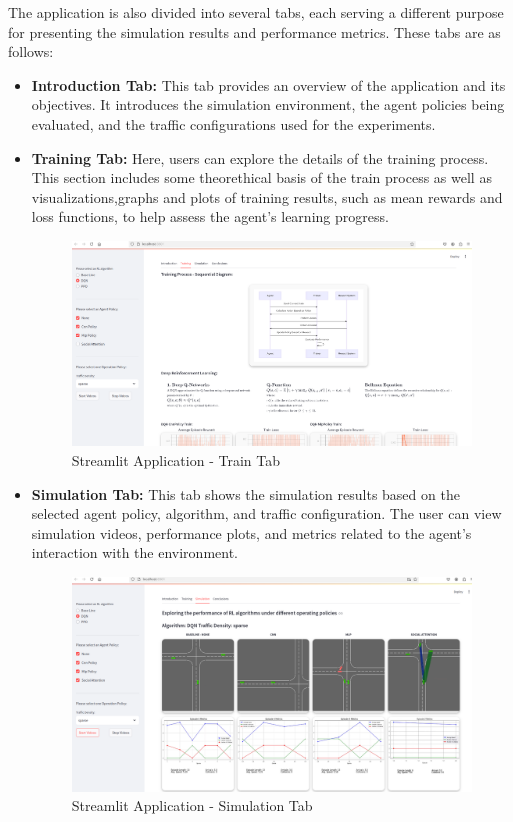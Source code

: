 The application is also divided into several tabs, each serving a different purpose for presenting the simulation results and performance metrics. 
These tabs are as follows:

\begin{itemize}
    \item \textbf{Introduction Tab:} 
    This tab provides an overview of the application and its objectives. It introduces the simulation environment, the agent policies being evaluated, and the traffic configurations used for the experiments.
    
    \item \textbf{Training Tab:} 
    Here, users can explore the details of the training process. This section includes some theorethical basis of the train process as well as visualizations,graphs and plots of training results, such as mean rewards and loss functions, to help assess the agent's learning progress.
    
    \begin{figure}[H]
        \centering
        \includegraphics[height=0.35\textheight]{images/app_train.png} 
        \caption{Streamlit Application - Train Tab}
    \end{figure}
    

    \item \textbf{Simulation Tab:} 
    This tab shows the simulation results based on the selected agent policy, algorithm, and traffic configuration. The user can view simulation videos, performance plots, and metrics related to the agent's interaction with the environment.
    
  
    \begin{figure}[H]
        \centering
        \includegraphics[height=0.35\textheight]{images/app_simulation.png} 
        \caption{Streamlit Application - Simulation Tab}
    \end{figure}
    


\end{itemize}
